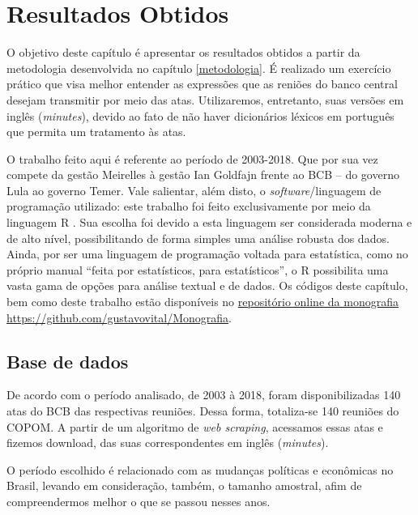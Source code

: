\chapter{Resultados Obtidos} \label{capitulo4}

O objetivo deste capítulo é apresentar os resultados obtidos a partir da metodologia desenvolvida no capítulo \ref{metodologia}. É realizado um exercício prático que visa melhor entender as expressões que as reniões do banco central desejam transmitir por meio das atas. Utilizaremos, entretanto, suas versões em inglês (\textit{minutes}), devido ao fato de não haver dicionários léxicos em português que permita um tratamento às atas.

O trabalho feito aqui é referente ao período de 2003-2018. Que por sua vez compete da gestão Meirelles à gestão Ian Goldfajn frente ao BCB -- do governo Lula ao governo Temer. Vale salientar, além disto, o \textit{software}/linguagem de programação utilizado: este trabalho foi feito exclusivamente por meio da linguagem R \cite{cran}. Sua escolha foi devido a esta linguagem ser considerada moderna e de alto nível, possibilitando de forma simples uma análise robusta dos dados. Ainda, por ser uma linguagem de programação voltada para estatística, como no próprio manual ``feita por estatísticos, para estatísticos'', o R possibilita uma vasta gama de opções para análise textual e de dados. Os códigos deste capítulo, bem como deste trabalho estão disponíveis no \href{https://github.com/gustavovital/Monografia}{repositório online da monografia} \url{https://github.com/gustavovital/Monografia}.

\section{Base de dados}

De acordo com o período analisado, de 2003 à 2018, foram disponibilizadas 140 atas do BCB das respectivas reuniões. Dessa forma, totaliza-se 140 reuniões do COPOM. A partir de um algoritmo de \textit{web scraping}, acessamos essas atas e fizemos download, das suas correspondentes em inglês (\textit{minutes}).

O período escolhido é relacionado com as mudanças políticas e econômicas no Brasil, levando em consideração, também, o tamanho amostral, afim de compreendermos melhor o que se passou nesses anos.


